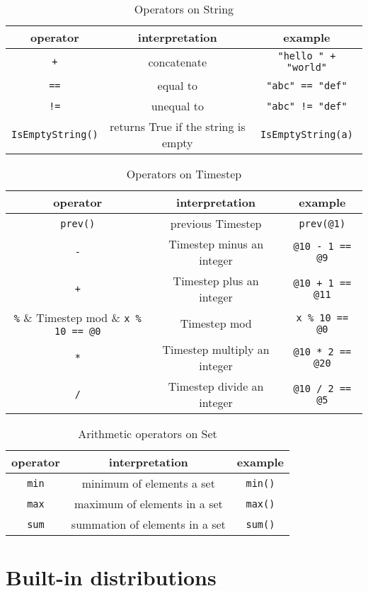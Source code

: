 \documentclass[12pt]{article}
\begin{document}
\begin{table}[H]
\centering
\caption{Operators on String}
\begin{tabular}{ c c c }
\toprule 
operator & interpretation & example \\
\midrule
{\tt +} & concatenate & \verb|"hello " + "world"|  \\ 
{\tt ==} & equal to & \verb|"abc" == "def"|  \\
{\tt !=} & unequal to & \verb|"abc" != "def"|\\ 
\verb|IsEmptyString()| & returns True if the string is empty & \verb|IsEmptyString(a)| \\
\bottomrule
\end{tabular}
\end{table}

\begin{table}[H]
\centering
\caption{Operators on Timestep}
\begin{tabular}{ c c c }
\toprule 
operator & interpretation & example \\
\midrule
\verb|prev()| & previous Timestep & \verb|prev(@1)|  \\
\verb|-| & Timestep minus an integer & \verb|@10 - 1 == @9|  \\
\verb|+| & Timestep plus an integer & \verb|@10 + 1 == @11|  \\
\verb|%| &  Timestep mod & \verb|x % 10 == @0|  \\
\verb|*| & Timestep multiply an integer & \verb|@10 * 2 == @20|  \\
\verb|/| & Timestep divide an integer & \verb|@10 / 2 == @5|  \\
\bottomrule
\end{tabular}
\end{table}

\begin{table}[H]
\centering
\caption{Arithmetic operators on Set}
\begin{tabular}{ c c c }
\toprule 
operator & interpretation & example \\
\midrule
\verb|min| & minimum of elements a set & \verb|min()|\\ 
\verb|max| & maximum of elements in a set & \verb|max()|\\
\verb|sum| & summation of elements in a set & \verb|sum()|\\ 
\bottomrule
\end{tabular}
\end{table}

\section{Built-in distributions}\label{builtin-distribution-appendix}

\end{document}
